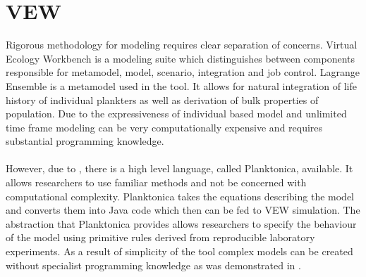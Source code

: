 \documentclass[12pt, a4paper]{report}
\begin{document}
\section{VEW}\label{sec:vew}

Rigorous methodology for modeling requires clear separation of concerns. Virtual Ecology Workbench \cite{Woods2005}
is a modeling suite which distinguishes between components responsible for metamodel, model, scenario,
integration and job control. Lagrange Ensemble is a metamodel used in the tool. It allows for natural
integration of life history of individual plankters as well as derivation of bulk properties of population.
Due to the expressiveness of individual based model and unlimited time frame modeling can be very
computationally expensive and requires substantial programming knowledge.
\\\\
However, due to \cite{Planktonica}, there is a high level language, called Planktonica, available. It
allows researchers to use familiar methods and not be concerned with computational complexity. Planktonica
takes the equations describing the model and converts them into Java code which then can be fed to VEW
simulation. The abstraction that Planktonica provides allows researchers to specify the behaviour of the
model using primitive rules derived from reproducible laboratory experiments. As a result of simplicity of
the tool complex models can be created without specialist programming knowledge as was demonstrated
in \cite{IndvPlanktonEcosystems}.
\end{document}
